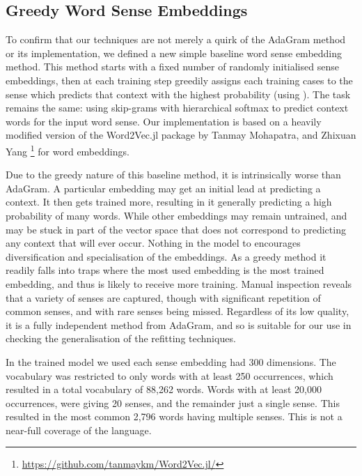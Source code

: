 \documentclass{sig-alternate}
\begin{document}
\subsection{Greedy Word Sense Embeddings}

To confirm that our techniques are not merely a quirk of the AdaGram method or its implementation, we defined a new simple baseline word sense embedding method.
This method starts with a fixed number of randomly initialised sense embeddings, then at each training step greedily assigns each training cases to the sense which predicts that context with the highest probability (using ). The task remains the same: using skip-grams with hierarchical softmax to predict context words for the input word sense.
Our implementation is based on a heavily modified version of the Word2Vec.jl package by Tanmay Mohapatra, and Zhixuan Yang \footnote{\url{https://github.com/tanmaykm/Word2Vec.jl/}} for word embeddings.

Due to the greedy nature of this baseline method, it is intrinsically worse than AdaGram. A particular embedding may get an initial lead at predicting a context. It then gets trained more, resulting in it generally predicting a high probability of many words. While other embeddings may remain untrained, and may be stuck in part of the vector space that does not correspond to predicting any context that will ever occur. Nothing in the model to encourages diversification and specialisation of the embeddings.
 As a greedy method it readily falls into traps where the most used embedding is the most trained embedding, and thus is likely to receive more training. Manual inspection reveals that a variety of senses are captured, though with significant repetition of common senses, and with rare senses being missed. Regardless of its low quality, it is a fully independent method from AdaGram, and so is suitable for our use in checking the generalisation of the refitting techniques.

In the trained model we used each sense embedding had 300 dimensions.
The vocabulary was restricted to only words with at least 250 occurrences, which resulted in a total vocabulary of 88,262 words. Words with at least 20,000 occurrences, were giving 20 senses, and the remainder just a single sense. This resulted in the most common 2,796 words having multiple senses. This is not a near-full coverage of the language. 
\end{document}
